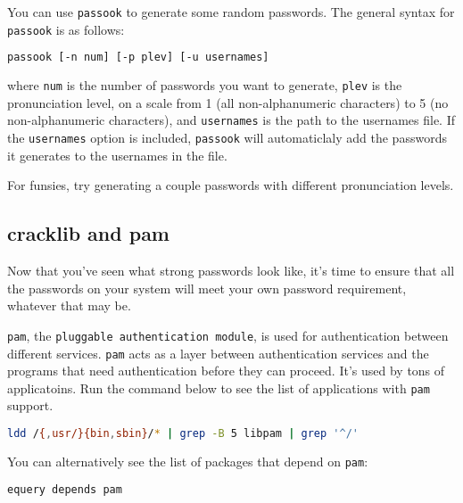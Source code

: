 \documentclass[11pt,a4paper]{article}
\begin{document}
You can use \verb|passook| to generate some random passwords. The general syntax for \verb|passook| is as follows: 

\begin{lstlisting}[basicstyle=\ttfamily, backgroundcolor = \color{lightgray}, language = bash, xleftmargin = 0cm, framexleftmargin = 1em]
passook [-n num] [-p plev] [-u usernames]
\end{lstlisting}

where \verb|num| is the number of passwords you want to generate, \verb|plev| is the pronunciation level, on a scale from 1 (all non-alphanumeric characters) to 5 (no non-alphanumeric characters), and \verb|usernames| is the path to the usernames file. If the \verb|usernames| option is included, \verb|passook| will automaticlaly add the passwords it generates to the usernames in the file. 

For funsies, try generating a couple passwords with different pronunciation levels. 

\subsection*{cracklib and pam}

\indent\indent Now that you've seen what strong passwords look like, it's time to ensure that all the passwords on your system will meet your own password requirement, whatever that may be.

\verb|pam|, the \verb|pluggable authentication module|, is used for authentication between different services. \verb|pam| acts as a layer between authentication services and the programs that need authentication before they can proceed. It's used by tons of applicatoins. Run the command below to see the list of applications with \verb|pam| support. 

\begin{lstlisting}[basicstyle=\ttfamily, backgroundcolor = \color{lightgray}, language = bash, xleftmargin = 0cm, framexleftmargin = 1em]
ldd /{,usr/}{bin,sbin}/* | grep -B 5 libpam | grep '^/'
\end{lstlisting}

You can alternatively see the list of packages that depend on \verb|pam|: 

\begin{lstlisting}[basicstyle=\ttfamily, backgroundcolor = \color{lightgray}, language = bash, xleftmargin = 0cm, framexleftmargin = 1em]
equery depends pam
\end{lstlisting}
\end{document}
